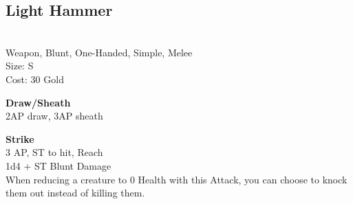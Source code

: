 \subsection{Light Hammer}\label{weapon:lightHammer}\\
Weapon, Blunt, One-Handed, Simple, Melee\\
Size: S\\
Cost: 30 Gold

\textbf{Draw/Sheath} \\
2AP draw, 3AP sheath

\textbf{Strike} \\
3 AP, ST to hit,  Reach\\
1d4 + \texttimes ST Blunt Damage\\
When reducing a creature to 0 Health with this Attack, you can choose to knock them out instead of killing them.
